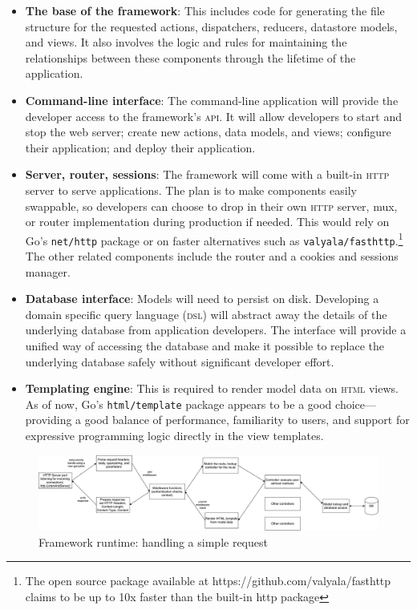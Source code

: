 \documentclass{article}
\begin{document}
\begin{itemize}
    \item \textbf{The base of the framework}: This includes code for generating the file structure for the requested actions, dispatchers, reducers, datastore models, and views. It also involves the logic and rules for maintaining the relationships between these components through the lifetime of the application.
    \item \textbf{Command-line interface}: The command-line application will provide the developer access to the framework's \textsc{api}. It will allow developers to start and stop the web server; create new actions, data models, and views; configure their application; and deploy their application.
    \item \textbf{Server, router, sessions}: The framework will come with a built-in \textsc{http} server to serve applications. The plan is to make components easily swappable, so developers can choose to drop in their own \textsc{http} server, mux, or router implementation during production if needed. This would rely on Go's \texttt{net/http} package or on faster alternatives such as \texttt{valyala/fasthttp}.\footnote{The open source package available at {https://github.com/valyala/fasthttp} claims to be up to 10x faster than the built-in http package} The other related components include the router and a cookies and sessions manager. 
    \item \textbf{Database interface}: Models will need to persist on disk. Developing a domain specific query language (\textsc{dsl}) will abstract away the details of the underlying database from application developers. The interface will provide a unified way of accessing the database and make it possible to replace the underlying database safely without significant developer effort.
    \item \textbf{Templating engine}: This is required to render model data on \textsc{html} views. As of now, Go's \texttt{html/template} package appears to be a good choice---providing a good balance of performance, familiarity to users, and support for expressive programming logic directly in the view templates.
\end{itemize}

\vspace{1em}

\begin{figure}[h]
\centering
\includegraphics[width=1.1\textwidth]{mvc-run.pdf}
\caption{Framework runtime: handling a simple request}
\end{figure}
\end{document}
